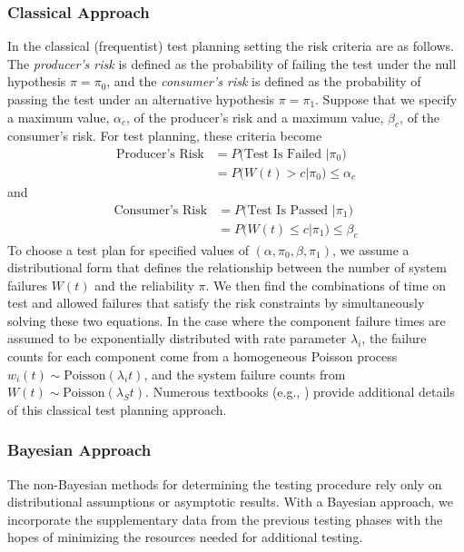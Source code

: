 \documentclass[12pt]{article}
\begin{document}
\subsubsection{Classical Approach}\label{sec321:ca}
In the classical (frequentist) test planning setting the risk criteria
are as follows. The \emph{producer's risk} is defined as the probability of
failing the test under the null hypothesis $\pi = \pi_0$, and the
\emph{consumer's risk} is defined as the probability of passing the test under an
alternative hypothesis $\pi = \pi_1$.  Suppose that we specify a maximum value,
$\alpha_c$, of the producer's risk and a maximum value, $\beta_c$, of the consumer's
risk. For test planning, these criteria become
$$
\begin{aligned}
	\text{Producer's Risk} &= P \text{(Test Is Failed } \vert \pi_0 \text{)} \\ &=
	P \text{(} W(t) > c \vert \pi_0 \text{)} \leq \alpha_c
\end{aligned}
$$
and
$$
\begin{aligned}
	\text{Consumer's Risk} &= P \text{(Test Is Passed } \vert \pi_1 \text{)} \\ &=
	P \text{(} W(t) \leq c \vert \pi_1 \text{)} \leq \beta_c
\end{aligned}
$$
To choose a test plan for specified values of $(\alpha, \pi_0, \beta, \pi_1)$,
we assume a distributional form that defines the relationship between the number
of system failures $W(t)$ and the reliability $\pi$.  We then find
the combinations of time on test and allowed failures that satisfy the risk constraints by simultaneously solving these two equations.  In the case where the component failure times are assumed to be exponentially distributed with rate parameter $\lambda_i$, the failure counts for
each component come from a homogeneous Poisson process $w_i(t) \sim
\text{Poisson}(\lambda_i t)$, and the system failure counts from $W(t) \sim
\text{Poisson}(\lambda_S t)$.  Numerous textbooks (e.g., \cite{ref8}) provide additional details of
this classical test planning approach.

\subsubsection{Bayesian Approach}
The non-Bayesian methods for determining the testing procedure rely only on distributional assumptions or asymptotic results. With a Bayesian approach, we
incorporate the supplementary data from the previous testing phases with the
hopes of minimizing the resources needed for additional testing.
\end{document}

